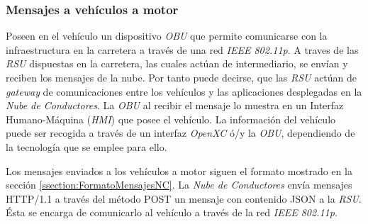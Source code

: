 \subsubsection{Mensajes a vehículos a motor}\label{sssection:mensajesvehiculomotor}
Poseen en el vehículo un dispositivo \emph{OBU} que permite comunicarse con la infraestructura en la carretera a través de una red \emph{IEEE 802.11p}. A traves de las \emph{RSU} dispuestas en la carretera, las cuales actúan de intermediario, se envían y reciben los mensajes de la nube. Por tanto puede decirse, que las \emph{RSU} actúan de \emph{gateway} de comunicaciones entre los vehículos y las aplicaciones desplegadas en la \emph{Nube de Conductores}. La \emph{OBU} al recibir el mensaje lo muestra en un Interfaz Humano-Máquina (\emph{HMI}) que posee el vehículo. La información del vehículo puede ser recogida a través de un interfaz \emph{OpenXC} ó/y la \emph{OBU}, dependiendo de la tecnología que se emplee para ello.

Los mensajes enviados a los vehículos a motor siguen el formato mostrado en la sección \ref{ssection:FormatoMensajesNC}. La \emph{Nube de Conductores} envía mensajes HTTP/1.1 a través del método POST un mensaje con contenido JSON a la \emph{RSU}. \'Esta se encarga de comunicarlo al vehículo a través de la red \emph{IEEE 802.11p}.

